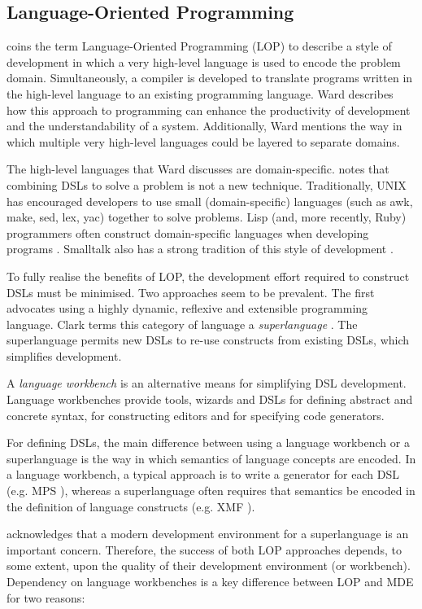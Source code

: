 \subsection{Language-Oriented Programming}
\cite{ward94lop} coins the term Language-Oriented Programming (LOP) to describe a style of development in which a very high-level language is used to encode the problem domain. Simultaneously, a compiler is developed to translate programs written in the high-level language to an existing programming language. Ward describes how this approach to programming can enhance the productivity of development and the understandability of a system. Additionally, Ward mentions the way in which multiple very high-level languages could be layered to separate domains.

The high-level languages that Ward discusses are domain-specific. \cite{fowler05language} notes that combining DSLs to solve a problem is not a new technique. Traditionally, UNIX has encouraged developers to use small (domain-specific) languages (such as awk, make, sed, lex, yac) together to solve problems. Lisp (and, more recently, Ruby) programmers often construct domain-specific languages when developing programs \cite{graham93lisp}. Smalltalk also has a strong tradition of this style of development \cite{fowler05language}.

To fully realise the benefits of LOP, the development effort required to construct DSLs must be minimised. Two approaches seem to be prevalent. The first advocates using a highly dynamic, reflexive and extensible programming language. Clark terms this category of language a \textit{superlanguage} \cite{clark08superlanguages}. The superlanguage permits new DSLs to re-use constructs from existing DSLs, which simplifies development.

A \textit{language workbench} \cite{fowler05language} is an alternative means for simplifying DSL development. Language workbenches provide tools, wizards and DSLs for defining abstract and concrete syntax, for constructing editors and for specifying code generators.

For defining DSLs, the main difference between using a language workbench or a superlanguage is the way in which semantics of language concepts are encoded. In a language workbench, a typical approach is to write a generator for each DSL (e.g. MPS \cite{mps}), whereas a superlanguage often requires that semantics be encoded in the definition of language constructs (e.g. XMF \cite{xmf}).

\cite{clark08superlanguages} acknowledges that a modern development environment for a superlanguage is an important concern. Therefore, the success of both LOP approaches depends, to some extent, upon the quality of their development environment (or workbench). Dependency on language workbenches is a key difference between LOP and MDE for two reasons:

